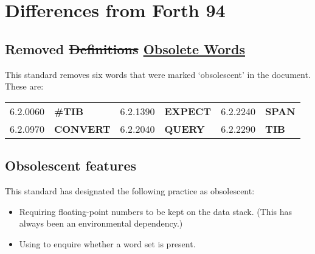 \cbend

\newpage
\cbstart{}
\section{Differences from Forth 94} %
\label{diff:forth94}

\subsection[Removed Obsolete Words]{Removed \sout{Definitions} \uline{Obsolete Words}} %

	This standard removes six words that were marked `obsolescent'
	in the  document.  These are:

\begin{tabular}{rl@{\qquad}rl@{\qquad}rl}
	6.2.0060	& \textbf{\#TIB}
&	6.2.1390	& \textbf{EXPECT}
&	6.2.2240	& \textbf{SPAN} \\
	6.2.0970	& \textbf{CONVERT}
&	6.2.2040	& \textbf{QUERY}
&	6.2.2290	& \textbf{TIB} \\
\end{tabular}


\subsection{Obsolescent features}
\label{diff:94:obsolete}

	This standard has designated the following practice as obsolescent:

\begin{itemize}
\item Requiring floating-point numbers to be kept on the data stack.
	(This has always been an environmental dependency.)

\item Using  to enquire whether a word set is present.
\end{itemize}

